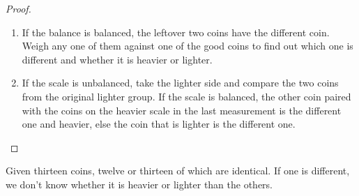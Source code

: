 \documentclass[name=Mehul\ Arora, andrewid=mehul21066, course=CSE121, num=1]{homework}
\begin{document}
\begin{proof}
\begin{enumerate}
\begin{enumerate}
\begin{enumerate}
                \item If the balance is balanced, the leftover two coins have the different coin. Weigh any one of them against one of the good coins to find out which one is different and whether it is heavier or lighter.
                \item If the scale is unbalanced, take the lighter side and compare the two coins from the original lighter group. If the scale is balanced, the other coin paired with the coins on the heavier scale in the last measurement is the different one and heavier, else the coin that is lighter is the different one.
            \end{enumerate}
        \end{enumerate}
    \end{enumerate}
\end{proof}

\separator{}
Given thirteen coins, twelve or thirteen of which are identical. If one is different, we don't know whether it is heavier or lighter than the others. 
\end{document}
